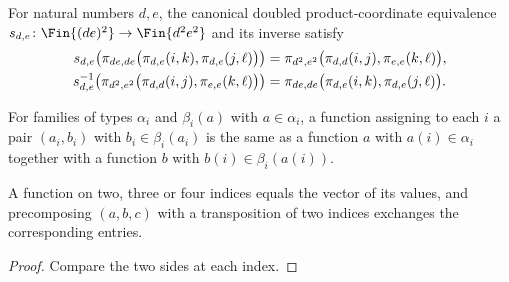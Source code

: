 \begin{definition}
    \label{def:mpu_doubled_product_coordinate_equiv}
    \leanok
    For natural numbers $d,e$, the canonical doubled product-coordinate
    equivalence $s_{d,e}\colon\Fin{(de)^2}\to\Fin{d^2e^2}$ and its inverse
    satisfy
    \begin{align}
        s_{d,e}\!\left(\pi_{de,de}
        \bigl(\pi_{d,e}(i,k),\pi_{d,e}(j,\ell)\bigr)\right)
         & =\pi_{d^2,e^2}
        \bigl(\pi_{d,d}(i,j),\pi_{e,e}(k,\ell)\bigr), \notag \\
        s_{d,e}^{-1}\!\left(\pi_{d^2,e^2}
        \bigl(\pi_{d,d}(i,j),\pi_{e,e}(k,\ell)\bigr)\right)
         & =\pi_{de,de}
        \bigl(\pi_{d,e}(i,k),\pi_{d,e}(j,\ell)\bigr).
        \label{eq:mpu_tensor_flattening_shuffle}
    \end{align}
\end{definition}

\begin{definition}
    \label{def:elementary_pi_sigma_equiv}
    \leanok
    For families of types $\alpha_i$ and $\beta_i(a)$ with $a\in\alpha_i$, a
    function assigning to each $i$ a pair $(a_i,b_i)$ with $b_i\in\beta_i(a_i)$
    is the same as a function $a$ with $a(i)\in\alpha_i$ together with a
    function $b$ with $b(i)\in\beta_i(a(i))$.
\end{definition}

\begin{lemma}
    \label{lem:elementary_short_tuple_vectors}
    \leanok
    A function on two, three or four indices equals the vector of its
    values, and precomposing $(a,b,c)$ with a transposition of two indices
    exchanges the corresponding entries.
\end{lemma}

\begin{proof}
    \leanok
    Compare the two sides at each index.
\end{proof}
